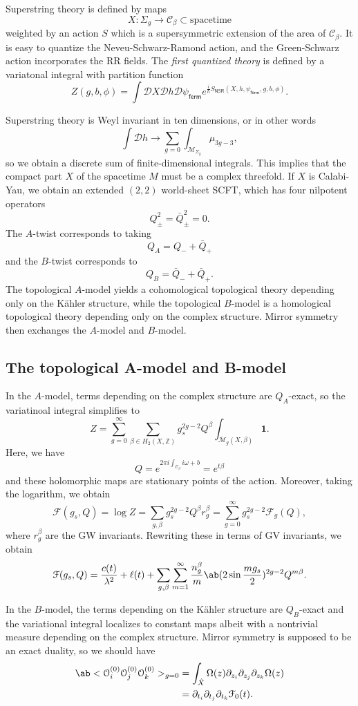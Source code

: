 \documentclass[10pt,oldfontcommands,oneside]{memoir}
\theoremstyle{definition}
\theoremstyle{remark}
\theoremstyle{plain}
\theoremstyle{definition}
\theoremstyle{remark}
\newcommand{\Z}{\mathbb{Z}}
\newcommand{\Mbar}{\overline{\mathcal{M}}}
\newcommand{\mc}[1]{\mathcal{#1}}
\newcommand{\ms}[1]{\mathsf{#1}}
\newcommand{\1}{\mathbf{1}}
\newcommand{\2}{\mathbf{2}}
\newcommand{\3}{\mathbf{3}}
\begin{document}
Superstring theory is defined by maps
\[ X \colon \Sigma_g \to \mc{C}_{\beta} \subset \text{spacetime} \]
weighted by an action $S$ which is a supersymmetric extension of the area of $\mc{C}_{\beta}$. It is easy to quantize the Neveu-Schwarz-Ramond action, and the Green-Schwarz action incorporates the RR fields. The \textit{first quantized theory} is defined by a variatonal integral with partition function
\[ Z(g,b,\phi) = \int \mc{D}X \mc{D}h \mc{D}\psi_{\ms{ferm}} e^{\frac{i}{\hbar} S_{\ms{NSR}}(X,h,\psi_{\ms{ferm}},g,b,\phi)}. \]

Superstring theory is Weyl invariant in ten dimensions, or in other words
\[ \int \mc{D}h \to \sum_{g = 0} \int_{\mc{M}_{\Sigma_g}} \mu_{3g-3}, \]
so we obtain a discrete sum of finite-dimensional integrals. This implies that the compact part $X$ of the spacetime $M$ must be a complex threefold. If $X$ is Calabi-Yau, we obtain an extended $(2,2)$ world-sheet SCFT, which has four nilpotent operators
\[ Q_{\pm}^2 = \bar{Q}_{\pm}^2 = 0. \]
The $A$-twist corresponds to taking
\[ Q_A = Q_- + \bar{Q}_+ \]
and the $B$-twist corresponds to
\[ Q_B = \bar{Q}_- + \bar{Q}_+. \]
The topological $A$-model yields a cohomological topological theory depending only on the K\"ahler structure, while the topological $B$-model is a homological topological theory depending only on the complex structure. Mirror symmetry then exchanges the $A$-model and $B$-model.

\subsection{The topological A-model and B-model}%
\label{sub:The topological A-model}

In the $A$-model, terms depending on the complex structure are $Q_A$-exact, so the variatinoal integral simplifies to
\[ Z = \sum_{g=0}^{\infty} \sum_{\beta \in H_2(X,\Z)} g_s^{2g-2} Q^{\beta} \int_{\Mbar_g(X,\beta)} \1. \]
Here, we have
\[ Q = e^{2\pi i \int_{\mc{C}_{\beta}}i\omega+b} = e^{t\beta} \]
and these holomorphic maps are stationary points of the action. Moreover, taking the logarithm, we obtain
\[ \mc{F}(g_s, Q) = \log Z = \sum_{g,\beta} g_s^{2g-2} Q^{\beta} r_g^{\beta} = \sum_{g=0}^{\infty} g_s^{2g-2} \mc{F}_g(Q), \]
where $r_g^{\beta}$ are the GW invariants.
Rewriting these in terms of GV invariants, we obtain
\[ \mc{F}(g_s, Q) = \frac{c(t)}{\lambda^2} + \ell(t) + \sum_{g,\beta} \sum_{m=1}^{\infty} \frac{n_g^{\beta}}{m}\ab(2 \sin \frac{m g_s}{2})^{2g-2} Q^{m\beta}. \]


In the $B$-model, the terms depending on the K\"ahler structure are $Q_B$-exact and the variational integral localizes to constant maps albeit with a nontrivial measure depending on the complex structure. Mirror symmetry is supposed to be an exact duality, so we should have
\begin{align*}
    \ab<\mc{O}_i^{(0)} \mc{O}_j^{(0)} \mc{O}_k^{(0)}>_{g=0} &= \int_{\hat{X}} \Omega(z) \partial_{z_i} \partial_{z_j} \partial_{z_k} \Omega(z) \\
    &= \partial_{t_i} \partial_{t_j} \partial_{t_k} \mc{F}_0(t).
\end{align*}
\end{document}
